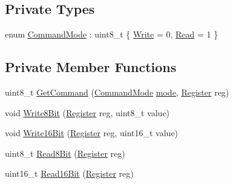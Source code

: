 \subsection*{Private Types}
\begin{DoxyCompactItemize}
\item 
enum \hyperlink{classcubesat_1_1ADT7311_a4a6cb79b6b3ec095455c94b20c9ca59e}{Command\+Mode} \+: uint8\+\_\+t \{ \hyperlink{classcubesat_1_1ADT7311_a4a6cb79b6b3ec095455c94b20c9ca59ead4d157343baa33cf5c433a363aee8da3}{Write} = 0, 
\hyperlink{classcubesat_1_1ADT7311_a4a6cb79b6b3ec095455c94b20c9ca59eabcbc3270c2b985ad1692355475b67986}{Read} = 1
 \}
\end{DoxyCompactItemize}
\subsection*{Private Member Functions}
\begin{DoxyCompactItemize}
\item 
uint8\+\_\+t \hyperlink{classcubesat_1_1ADT7311_afa5e19c1e97ce0623c658120f3c02027}{Get\+Command} (\hyperlink{classcubesat_1_1ADT7311_a4a6cb79b6b3ec095455c94b20c9ca59e}{Command\+Mode} \hyperlink{classcubesat_1_1SPIDevice_ac69ac6b9e9ac9ed194384a3fa07ecbde}{mode}, \hyperlink{classcubesat_1_1ADT7311_a0c841a239b3da653d4304377b3e83b45}{Register} reg)
\item 
void \hyperlink{classcubesat_1_1ADT7311_acfb6dbbe3616e39449808880f96f610c}{Write8\+Bit} (\hyperlink{classcubesat_1_1ADT7311_a0c841a239b3da653d4304377b3e83b45}{Register} reg, uint8\+\_\+t value)
\item 
void \hyperlink{classcubesat_1_1ADT7311_a78f061f3e7a5a4f060868b53839c7af6}{Write16\+Bit} (\hyperlink{classcubesat_1_1ADT7311_a0c841a239b3da653d4304377b3e83b45}{Register} reg, uint16\+\_\+t value)
\item 
uint8\+\_\+t \hyperlink{classcubesat_1_1ADT7311_a0f0c46f2a75ebb5661e27c3340b089a4}{Read8\+Bit} (\hyperlink{classcubesat_1_1ADT7311_a0c841a239b3da653d4304377b3e83b45}{Register} reg)
\item 
uint16\+\_\+t \hyperlink{classcubesat_1_1ADT7311_a9147cb2c01b121fe0576eb36c9fcc18f}{Read16\+Bit} (\hyperlink{classcubesat_1_1ADT7311_a0c841a239b3da653d4304377b3e83b45}{Register} reg)
\end{DoxyCompactItemize}
